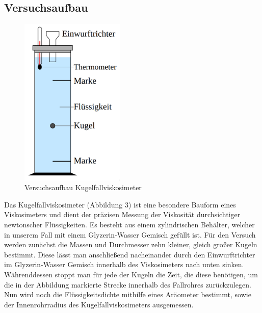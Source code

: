 \documentclass{article}
\begin{document}
\subsection{Versuchsaufbau}
\begin{figure}[H]
\centering
\includegraphics[width=140pt]{kugelfall.png}
\caption{Versuchsaufbau Kugelfallviskosimeter \cite{1}}
\label{fig:length_eight_mouse}
\end{figure}
Das Kugelfallviskosimeter (Abbildung 3) ist eine besondere Bauform eines Viskosimeters und dient der präzisen Messung der Viskosität durchsichtiger newtonscher Flüssigkeiten. Es besteht aus einem zylindrischen Behälter, welcher in unserem Fall mit einem Glyzerin-Wasser Gemisch gefüllt ist. Für den Versuch werden zunächst die Massen und Durchmesser zehn kleiner, gleich großer Kugeln bestimmt. Diese lässt man anschließend nacheinander durch den Einwurftrichter im Glyzerin-Wasser Gemisch innerhalb des Viskosimeters nach unten sinken. Währenddessen stoppt man für jede der Kugeln die Zeit, die diese benötigen, um die in der Abbildung markierte Strecke innerhalb des Fallrohres zurückzulegen.
Nun wird noch die Flüssigkeitsdichte mithilfe eines Aräometer bestimmt, sowie der Innenrohrradius des Kugelfallviskosimeters ausgemessen.
\newpage
\end{document}
